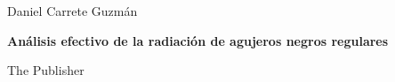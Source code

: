 \documentclass[a4paper,12pt]{book}
\newcommand*{\plogo}{\fbox{$\mathcal{L}$}} %
\begin{document}
\frontmatter

\begin{titlepage} %

	\raggedleft %
	
	\vspace*{\baselineskip} %
	
	
	{\Large Daniel Carrete Guzmán} %
	
	\vspace*{0.167\textheight} %
	
	
	\textbf{\LARGE Análisis efectivo de la radiación de
	agujeros negros regulares}\\[\baselineskip] %
	
	
	
	\vfill %
	
	
	{\large The Publisher~~\plogo} %
	
	\vspace*{3\baselineskip} %
\end{titlepage}

\tableofcontents
\listoffigures
\listoftables

\mainmatter



\backmatter
\printbibliography
\nocite{*}
\end{document}
